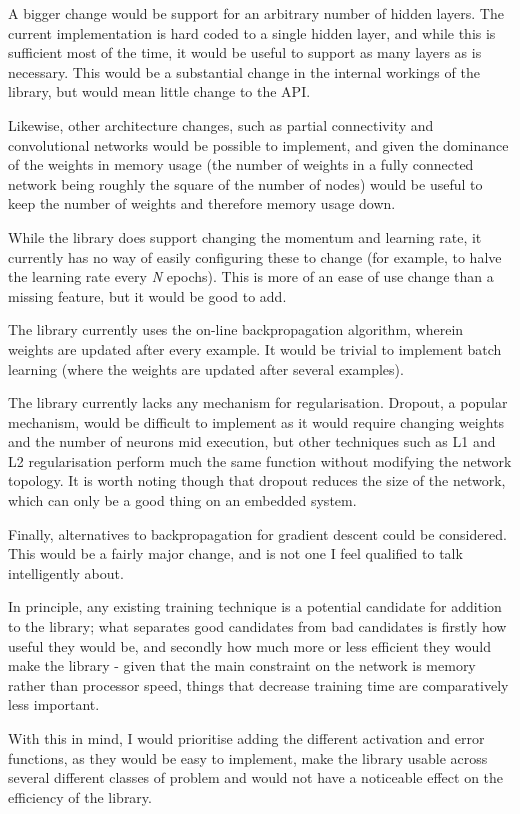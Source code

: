 \documentclass[a4paper]{article}
\begin{document}
A bigger change would be support for an arbitrary number of hidden layers. The current implementation is hard coded to a single hidden layer, and while this is sufficient most of the time, it would be useful to support as many layers as is necessary. 
This would be a substantial change in the internal workings of the library, but would mean little change to the API.

Likewise, other architecture changes, such as partial connectivity and convolutional networks would be possible to implement, and given the dominance of the weights in memory usage (the number of weights in a fully connected network being roughly the square of the number of nodes) would be useful to keep the number of weights and therefore memory usage down.

While the library does support changing the momentum and learning rate, it currently has no way of easily configuring these to change (for example, to halve the learning rate every \textit{N} epochs). This is more of an ease of use change than a missing feature, but it would be good to add.

The library currently uses the on-line backpropagation algorithm, wherein weights are updated after every example. It would be trivial to implement batch learning (where the weights are updated after several examples). 

The library currently lacks any mechanism for regularisation. Dropout, a popular mechanism, would be difficult to implement as it would require changing weights and the number of neurons mid execution, but other techniques such as L1 and L2 regularisation perform much the same function without modifying the network topology. It is worth noting though that dropout reduces the size of the network, which can only be a good thing on an embedded system.

Finally, alternatives to backpropagation for gradient descent could be considered. This would be a fairly major change, and is not one I feel qualified to talk intelligently about.

In principle, any existing training technique is a potential candidate for addition to the library; what separates good candidates from bad candidates is firstly how useful they would be, and secondly how much more or less efficient they would make the library - given that the main constraint on the network is memory rather than processor speed, things that decrease training time are comparatively less important.

With this in mind, I would prioritise adding the different activation and error functions, as they would be easy to implement, make the library usable across several different classes of problem and would not have a noticeable effect on the efficiency of the library.
\end{document}
